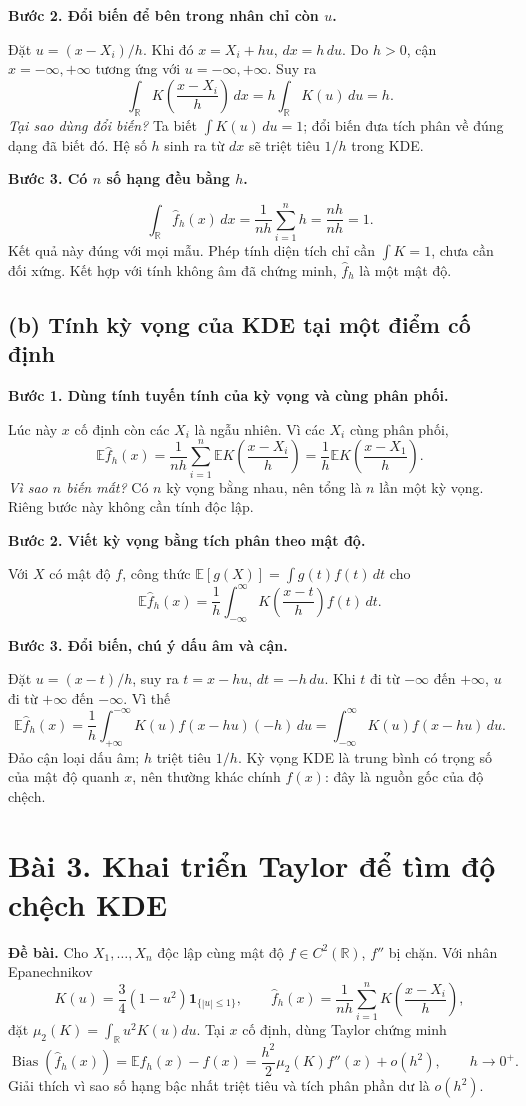 \documentclass[11pt,a4paper]{article}
\newcommand{\E}{\mathbb E}
\newcommand{\R}{\mathbb R}
\newcommand{\fh}{\widehat f_h}
\DeclareMathOperator{\Bias}{Bias}
\newcommand{\buoc}[1]{\par\medskip\textbf{#1}\par}
\begin{document}
\buoc{Bước 2. Đổi biến để bên trong nhân chỉ còn $u$.}
Đặt $u=(x-X_i)/h$. Khi đó $x=X_i+hu$, $dx=h\,du$. Do $h>0$, cận $x=-\infty,+\infty$ tương ứng với $u=-\infty,+\infty$. Suy ra
\[
\int_{\R}K\!\left(\frac{x-X_i}{h}\right)\,dx
=h\int_{\R}K(u)\,du=h.
\]
\textit{Tại sao dùng đổi biến?} Ta biết $\int K(u)\,du=1$; đổi biến đưa tích phân về đúng dạng đã biết đó. Hệ số $h$ sinh ra từ $dx$ sẽ triệt tiêu $1/h$ trong KDE.

\buoc{Bước 3. Có $n$ số hạng đều bằng $h$.}
\[
\boxed{\int_{\R}\fh(x)\,dx=\frac1{nh}\sum_{i=1}^nh
=\frac{nh}{nh}=1.}
\]
Kết quả này đúng với mọi mẫu. Phép tính diện tích chỉ cần $\int K=1$, chưa cần đối xứng. Kết hợp với tính không âm đã chứng minh, $\fh$ là một mật độ.

\subsection*{(b) Tính kỳ vọng của KDE tại một điểm cố định}
\buoc{Bước 1. Dùng tính tuyến tính của kỳ vọng và cùng phân phối.}
Lúc này $x$ cố định còn các $X_i$ là ngẫu nhiên. Vì các $X_i$ cùng phân phối,
\[
\E\fh(x)=\frac1{nh}\sum_{i=1}^n\E K\!\left(\frac{x-X_i}{h}\right)
=\frac1h\E K\!\left(\frac{x-X_1}{h}\right).
\]
\textit{Vì sao $n$ biến mất?} Có $n$ kỳ vọng bằng nhau, nên tổng là $n$ lần một kỳ vọng. Riêng bước này không cần tính độc lập.

\buoc{Bước 2. Viết kỳ vọng bằng tích phân theo mật độ.}
Với $X$ có mật độ $f$, công thức $\E[g(X)]=\int g(t)f(t)\,dt$ cho
\[
\E\fh(x)=\frac1h\int_{-\infty}^{\infty}K\!\left(\frac{x-t}{h}\right)f(t)\,dt.
\]
\buoc{Bước 3. Đổi biến, chú ý dấu âm và cận.}
Đặt $u=(x-t)/h$, suy ra $t=x-hu$, $dt=-h\,du$. Khi $t$ đi từ $-\infty$ đến $+\infty$, $u$ đi từ $+\infty$ đến $-\infty$. Vì thế
\[
\E\fh(x)=\frac1h\int_{+\infty}^{-\infty}K(u)f(x-hu)(-h)\,du
=\boxed{\int_{-\infty}^{\infty}K(u)f(x-hu)\,du}.
\]
Đảo cận loại dấu âm; $h$ triệt tiêu $1/h$. Kỳ vọng KDE là trung bình có trọng số của mật độ quanh $x$, nên thường khác chính $f(x)$: đây là nguồn gốc của độ chệch.

\clearpage
\section*{Bài 3. Khai triển Taylor để tìm độ chệch KDE}\label{core:bias}
\textbf{Đề bài.} Cho $X_1,\ldots,X_n$ độc lập cùng mật độ $f\in C^2(\R)$,
$f''$ bị chặn. Với nhân Epanechnikov
\[
K(u)=\frac34(1-u^2)\mathbf1_{\{|u|\leq1\}},\qquad
\widehat f_h(x)=\frac1{nh}\sum_{i=1}^nK\left(\frac{x-X_i}{h}\right),
\]
đặt $\mu_2(K)=\int_{\R}u^2K(u)du$. Tại $x$ cố định, dùng Taylor chứng minh
\[
\Bias(\widehat f_h(x))=\E\widehat f_h(x)-f(x)
=\frac{h^2}{2}\mu_2(K)f''(x)+o(h^2),\qquad h\to0^+.
\]
Giải thích vì sao số hạng bậc nhất triệt tiêu và tích phân phần dư là $o(h^2)$.
\end{document}
